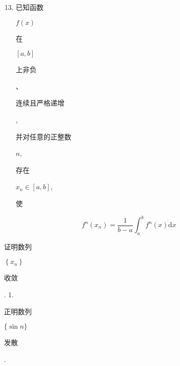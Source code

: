 \documentclass[10pt]{article}
\begin{document}
\begin{enumerate}
  \setcounter{enumi}{12}
  \item \begin{CJK}{UTF8}{mj}已知函数\end{CJK} $f(x)$ \begin{CJK}{UTF8}{mj}在\end{CJK} $[a, b]$ \begin{CJK}{UTF8}{mj}上非负\end{CJK}、\begin{CJK}{UTF8}{mj}连续且严格递增\end{CJK}, \begin{CJK}{UTF8}{mj}并对任意的正整数\end{CJK} $n$, \begin{CJK}{UTF8}{mj}存在\end{CJK} $x_{n} \in[a, b]$, \begin{CJK}{UTF8}{mj}使\end{CJK}
\end{enumerate}
$$
f^{n}\left(x_{n}\right)=\frac{1}{b-a} \int_{a}^{b} f^{n}(x) \mathrm{d} x
$$
\begin{CJK}{UTF8}{mj}证明数列\end{CJK} $\left\{x_{n}\right\}$ \begin{CJK}{UTF8}{mj}收敛\end{CJK}. 1. \begin{CJK}{UTF8}{mj}正明数列\end{CJK} $\{\sin n\}$ \begin{CJK}{UTF8}{mj}发散\end{CJK}.
\end{document}
